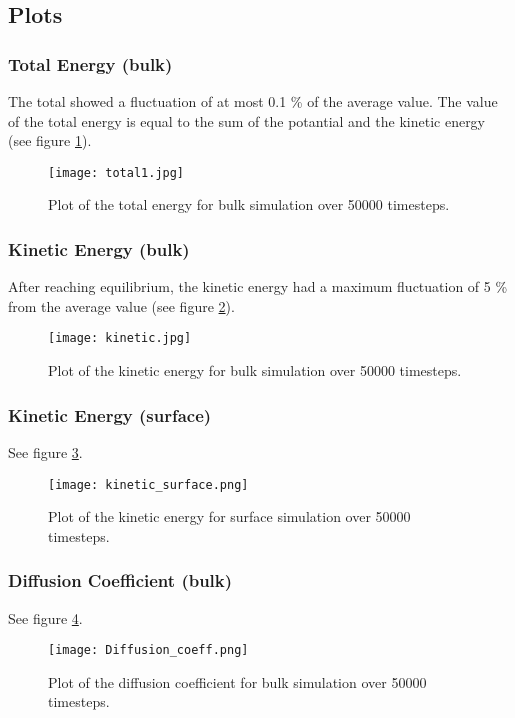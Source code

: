 \subsection{Plots}
\subsubsection{Total Energy (bulk)}
The total showed a fluctuation of at most 0.1 \% of the average value. The value of the total energy is equal to the sum of the potantial and the kinetic energy (see figure  \ref{totale}). \nopagebreak
\nopagebreak\begin{figure}[H]
	\centering
	\texttt{[image: total1.jpg]}
	\caption{Plot of the total energy for bulk simulation over 50000 timesteps.}
	\label{totale}
\end{figure}

\subsubsection{Kinetic Energy (bulk)}
After reaching equilibrium, the kinetic energy had a maximum fluctuation of 5 \% from the average value (see figure \ref{kinetic}).\nopagebreak
\nopagebreak\begin{figure}[H]
	\centering
	\texttt{[image: kinetic.jpg]}
	\caption{Plot of the kinetic energy for bulk simulation over 50000 timesteps.}
	\label{kinetic}
\end{figure}

\subsubsection{Kinetic Energy (surface)}
See figure \ref{kineticsf}.\nopagebreak
\nopagebreak\begin{figure}[H]
	\centering
	\texttt{[image: kinetic\_surface.png]}
	\caption{Plot of the kinetic energy for surface simulation over 50000 timesteps.}
	\label{kineticsf}
\end{figure}

\subsubsection{Diffusion Coefficient (bulk)}
See figure \ref{diff}.\nopagebreak
\nopagebreak\begin{figure}[H]
	\centering
	\texttt{[image: Diffusion\_coeff.png]}
	\caption{Plot of the diffusion coefficient for bulk simulation over 50000 timesteps.}
	\label{diff}
\end{figure}

